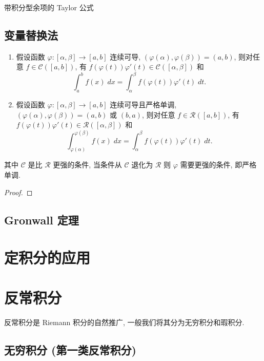 \documentclass[cn,toc=twocol]{elegantbook}
\newcommand{\ITEMS}{\begin{enumerate}}
\newcommand{\ITEME}{\end{enumerate}}
\begin{document}
\begin{theorem}{带积分型余项的 Taylor 公式}
\end{theorem}

\subsection{变量替换法}

\begin{theorem}
	\ITEMS
		\item 假设函数 $\varphi : [\alpha,\beta] \to [a,b]$ 连续可导, $(\varphi(\alpha), \varphi(\beta)) = (a,b)$, 则对任意 $f \in \mathscr{C}([a,b])$, 有 $f(\varphi(t))\varphi'(t) \in \mathscr{C}([\alpha,\beta])$ 和
		\[
			\int_a^b f(x)\;dx = \int_\alpha^\beta f(\varphi(t))\varphi'(t)\;dt.
		\]
		
		\item 假设函数 $\varphi : [\alpha,\beta] \to [a,b]$ 连续可导且严格单调, $(\varphi(\alpha), \varphi(\beta)) = (a,b)$ 或 $(b,a)$, 则对任意 $f \in \mathscr{R}([a,b])$, 有 $f(\varphi(t))\varphi'(t) \in \mathscr{R}([\alpha,\beta])$ 和
		\[
			\int_{\varphi(\alpha)}^{\varphi(\beta)} f(x)\;dx = \int_\alpha^\beta f(\varphi(t))\varphi'(t)\;dt.
		\]
	\ITEME
\end{theorem}
\begin{remark}
	其中 $\mathscr{C}$ 是比 $\mathscr{R}$ 更强的条件, 当条件从 $\mathscr{C}$ 退化为 $\mathscr{R}$ 则 $\varphi$ 需要更强的条件, 即严格单调.
\end{remark}
\begin{proof}
	
\end{proof}

\subsection{Gronwall 定理}


\section{定积分的应用}

\section{反常积分}

反常积分是 Riemann 积分的自然推广, 一般我们将其分为无穷积分和瑕积分.

\subsection{无穷积分 (第一类反常积分)}
\end{document}

